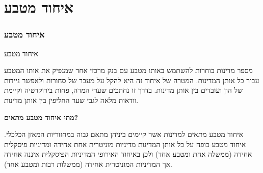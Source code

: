 \documentclass[10pt,usenames,dvipsnames]{beamer}
\begin{document}
\begin{RTL}
\begin{frame}
\end{frame}

\section{איחוד מטבע}
\begin{frame}
    \frametitle{איחוד מטבע}
    \begin{block}{איחוד מטבע}
        
    מספר מדינות בוחרות להשתמש באותו מטבע עם בנק מרכזי אחד שמנפיק את אותו המטבע עבור כל אותן המדינות. המטרה של איחוד זה היא להקל על מעבר של סחורות ולאפשר ניידות של הון ועובדים בין אותן מדינות. בדרך זו נחתכים שערי המרה, פחות בירוקרטיה וקיימת וודאות מלאה לגבי שער החליפין בין אותן מדינות.

\textbf{מתי איחוד מטבע מתאים?}

איחוד מטבע מתאים למדינות אשר קיימים ביניהן מתאם גבוה במחזוריות המאזן הכלכלי. איחוד מטבע כופה על כל אותן המדינות מדיניות מוניטרית אחת אחידה ומדיניות פיסקלית אחידה (ממשלה אחת ומטבע אחד) ולכן באיחוד האירופי המדיניות הפיסקלית איננה אחידה אך המדיניות המוניטרית אחידה (ממשלות רבות ומטבע אחד).
\end{block}
    

\end{frame}
\end{RTL}
\end{document}
